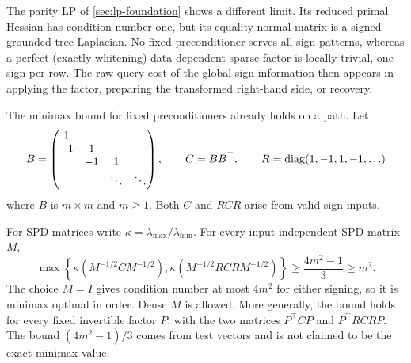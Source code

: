 The parity LP of \cref{sec:lp-foundation} shows a different limit.  Its
reduced primal Hessian has condition number one, but its equality normal
matrix is a signed grounded-tree Laplacian.  No fixed preconditioner serves
all sign patterns, whereas a perfect (exactly whitening) data-dependent
sparse factor is locally trivial, one sign per row.  The raw-query
cost of the global sign information then appears in applying the factor,
preparing the transformed right-hand side, or recovery.

The minimax bound for fixed preconditioners already holds on a path.  Let
\begin{equation}
 B=\begin{pmatrix}
 1\\-1&1\\&-1&1\\&&\ddots&\ddots
 \end{pmatrix},\qquad C=BB^\top,\qquad
 R=\operatorname{diag}(1,-1,1,-1,\ldots)                               \label{eq:prec-path-pair}
\end{equation}
where $B$ is $m\times m$ and $m\geq1$.  Both $C$ and $RCR$ arise from valid
sign inputs.

\begin{theorem}
\label{thm:prec-fixed-minimax}
For SPD matrices write $\kappa=\lambda_{\max}/\lambda_{\min}$.
For every input-independent SPD matrix $M$,
\begin{equation}
 \max\left\{
 \kappa(M^{-1/2}CM^{-1/2}),
 \kappa(M^{-1/2}RCRM^{-1/2})
 \right\}\geq\frac{4m^2-1}{3}\geq m^2.                  \label{eq:prec-minimax}
\end{equation}
The choice $M=I$ gives condition number at most $4m^2$ for either signing,
so it is minimax optimal in order.  Dense $M$ is allowed.  More generally,
the bound holds for every fixed invertible factor $P$, with the two matrices
$P^\top CP$ and $P^\top RCRP$.  The bound $(4m^2-1)/3$ comes from test vectors and is
not claimed to be the exact minimax value.
\end{theorem}

